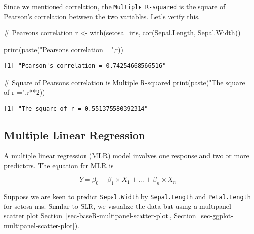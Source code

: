 \documentclass[
  letterpaper,
  DIV=11,
  numbers=noendperiod]{scrreprt}
\newenvironment{Shaded}{\begin{snugshade}}{\end{snugshade}}
\newcommand{\CommentTok}[1]{\textcolor[rgb]{0.37,0.37,0.37}{#1}}
\newcommand{\DecValTok}[1]{\textcolor[rgb]{0.68,0.00,0.00}{#1}}
\newcommand{\FunctionTok}[1]{\textcolor[rgb]{0.28,0.35,0.67}{#1}}
\newcommand{\NormalTok}[1]{\textcolor[rgb]{0.00,0.23,0.31}{#1}}
\newcommand{\OtherTok}[1]{\textcolor[rgb]{0.00,0.23,0.31}{#1}}
\newcommand{\SpecialCharTok}[1]{\textcolor[rgb]{0.37,0.37,0.37}{#1}}
\newcommand{\StringTok}[1]{\textcolor[rgb]{0.13,0.47,0.30}{#1}}
\begin{document}
Since we mentioned correlation, the \texttt{Multiple\ R-squared} is the
square of Pearson's correlation between the two variables. Let's verify
this.

\begin{Shaded}
\begin{Highlighting}[]
\CommentTok{\# Pearson\textquotesingle{}s correlation}
\NormalTok{r }\OtherTok{\textless{}{-}} \FunctionTok{with}\NormalTok{(setosa\_iris, }\FunctionTok{cor}\NormalTok{(Sepal.Length, Sepal.Width))}

\FunctionTok{print}\NormalTok{(}\FunctionTok{paste}\NormalTok{(}\StringTok{"Pearson\textquotesingle{}s correlation ="}\NormalTok{,r))}
\end{Highlighting}
\end{Shaded}

\begin{verbatim}
[1] "Pearson's correlation = 0.74254668566516"
\end{verbatim}

\begin{Shaded}
\begin{Highlighting}[]
\CommentTok{\# Square of Pearson\textquotesingle{}s correlation is Multiple R{-}squared}
\FunctionTok{print}\NormalTok{(}\FunctionTok{paste}\NormalTok{(}\StringTok{"The square of r ="}\NormalTok{,r}\SpecialCharTok{**}\DecValTok{2}\NormalTok{))}
\end{Highlighting}
\end{Shaded}

\begin{verbatim}
[1] "The square of r = 0.551375580392314"
\end{verbatim}

\subsection{Multiple Linear Regression}\label{sec-04-MLR}

A multiple linear regression (MLR) model involves one response and two
or more predictors. The equation for MLR is

\[Y = \beta_{0} + \beta_{1} \times X_{1} + ... + \beta_{n} \times X_{n}\]

Suppose we are keen to predict \texttt{Sepal.Width} by
\texttt{Sepal.Length} and \texttt{Petal.Length} for setosa iris. Similar
to SLR, we visualize the data but using a multipanel scatter plot
Section~\ref{sec-baseR-multipanel-scatter-plot},
Section~\ref{sec-ggplot-multipanel-scatter-plot}).
\end{document}
